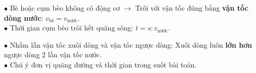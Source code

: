 \documentclass[14pt,a4paper,oneside]{extbook}
\begin{document}
\vspace{3mm}

\noindent
\begin{minipage}[t]{0.54\textwidth}
  \begin{tcolorbox}[
    enhanced,
    title={\footnotesize\bfseries\color{white}\faLifeRing\ Cụm bèo / chiếc bè trôi trên sông},
    colback=green!3!white,
    colframe=green!60!black,
    arc=2.5mm, boxrule=0.8pt, top=1.8mm, bottom=1.8mm, left=2.2mm, right=2.2mm
  ]
    \footnotesize
    $\bullet$ Bè hoặc cụm bèo không có động cơ $\rightarrow$ Trôi với vận tốc đúng bằng \textbf{vận tốc dòng nước}: $v_{\text{bè}} = v_{\text{nước}}$.\\
    $\bullet$ Thời gian cụm bèo trôi hết quãng sông: $t = s : v_{\text{nước}}$.
  \end{tcolorbox}
\end{minipage}%
\hfill
\begin{minipage}[t]{0.44\textwidth}
  \begin{tcolorbox}[
    enhanced,
    title={\footnotesize\bfseries\color{white}\faExclamationTriangle\ Mẹo tránh bẫy trắc nghiệm},
    colback=red!2!white,
    colframe=red!70!black,
    arc=2.5mm, boxrule=0.8pt, top=1.8mm, bottom=1.8mm, left=2.2mm, right=2.2mm
  ]
    \footnotesize
    $\bullet$ Nhầm lẫn vận tốc xuôi dòng và vận tốc ngược dòng: Xuôi dòng luôn \textbf{lớn hơn} ngược dòng $2$ lần vận tốc nước.\\
    $\bullet$ Chú ý đơn vị quãng đường và thời gian trong suốt bài toán.
  \end{tcolorbox}
\end{minipage}
\end{document}
